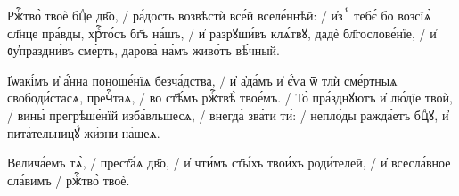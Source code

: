 \documentclass{article}
\begin{document}
%
%
Ржⷭ҇тво̀ твоѐ бцⷣе дв҃о, /
ра́дость возвѣстѝ все́й вселе́ннѣй: /
и҆зⸯ тебє́ бо возсїѧ̀ сл҃нце пра́вды, хрⷭ҇то́съ бг҃ъ на́шъ, /
 и҆ разрꙋши́въ клѧ́твꙋ, дадѐ бл҃гослове́нїе, /
и҆ ᲂу҆праздни́въ сме́рть, дарова̀ на́мъ живо́тъ вѣ́чный.

%
І҆ѡакі́мъ и҆ а҆́нна поноше́нїѧ безча́дства, /
и҆ а҆да́мъ и҆ є҆́ѵа ѿ тлѝ сме́ртныѧ свободи́стасѧ, пречⷭ҇таѧ, /
во ст҃ѣ́мъ ржⷭ҇твѣ̀ твое́мъ. /
То̀ пра́зднꙋютъ и҆ лю́дїе твоѝ, /
вины̀ прегрѣше́нїй изба́вльшесѧ, /
внегда̀ зва́ти ти́: /
непло́ды ражда́етъ бцⷣꙋ, и҆ пита́тельницꙋ́ жи́зни на́шеѧ.

%
Велича́емъ тѧ̀, /
прест҃а́ѧ дв҃о, /
и҆ чти́мъ ст҃ы́хъ твои́хъ роди́телей, /
и҆ всесла́вное сла́вимъ /
ржⷭ҇тво̀ твоѐ.
\end{document}
